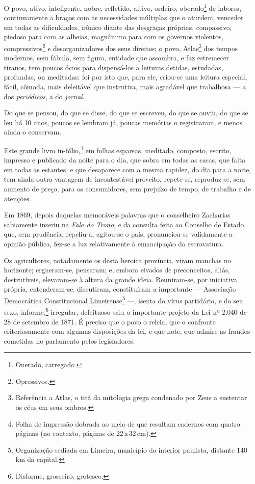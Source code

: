 O povo, ativo, inteligente, nobre, refletido, altivo, ordeiro,
oberado\footnote{Onerado, carregado.} de labores, continuamente a
braços com as necessidades múltiplas que o aturdem, vencedor em todas as
dificuldades, irônico diante das desgraças próprias, compassivo, piedoso
para com as alheias, magnânimo para com os governos violentos,
compressivos\footnote{Opressivos.} e desorganizadores dos seus
direitos; o povo, Atlas\footnote{Referência a Atlas, o titã da
  mitologia grega condenado por Zeus a sustentar os céus em seus ombros.}
dos tempos modernos, sem fábula, sem figura, entidade que assombra, e
faz estremecer tiranos, tem poucos ócios para dispensá-los a leituras
detidas, estudadas, profundas, ou meditadas: foi por isto que, para ele,
criou-se uma leitura especial, fácil, cômoda, mais deleitável que
instrutiva, mais agradável que trabalhosa --- a dos \emph{periódicos},
a do \emph{jornal}.

Do que se pensou, do que se disse, do que se escreveu, do que se ouviu,
do que se leu há 10 anos, poucos se lembram já, poucas memórias o
registraram, e menos ainda o conservam.

Este grande livro in-fólio,\footnote{
  Folha de impressão dobrada ao meio de que resultam cadernos com quatro páginas (no
  contexto, páginas de 22\,x\,32\,cm).} em folhas esparsas, meditado,
composto, escrito, impresso e publicado da noite para o dia, que sobra
em todas as casas, que falta em todas as estantes, e que desaparece com
a mesma rapidez, do dia para a noite, tem ainda outra vantagem de
incontestável proveito, repete-se, reproduz-se, sem aumento de preço,
para os consumidores, sem prejuízo de tempo, de trabalho e de atenções.

Em 1869, depois daquelas memoráveis palavras que o conselheiro Zacharias
sabiamente inseriu na \emph{Fala do Trono}, e da consulta feita ao
Conselho de Estado, que, sem prudência, repeliu-a, agitou-se o país,
pronunciou-se validamente a opinião pública, fez-se a luz relativamente
à emancipação da escravatura.

Os agricultores, notadamente os desta heroica província, viram manchas
no horizonte; ergueram-se, pensaram; e, embora eivados de preconceitos,
aliás, destrutíveis, elevaram-se à altura da grande ideia. Reuniram-se,
por iniciativa própria, entenderam-se, discutiram, constituíram a
importante --- Associação Democrática Constitucional
Limeirense\footnote{Organização sediada em Limeira, município do
  interior paulista, distante 140 km da capital.} ---, isenta do vírus
partidário, e do seu sexo, informe,\footnote{Disforme, grosseiro,
  grotesco.} irregular, defeituoso saiu o importante projeto da Lei nº
2.040 de 28 de setembro de 1871. É preciso que o povo o releia; que o
confronte criteriosamente com algumas disposições da lei, e que note,
que admire as fraudes cometidas no parlamento pelos legisladores.

